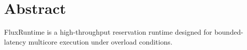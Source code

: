 \section*{Abstract}

FluxRuntime is a high-throughput reservation runtime designed for bounded-latency multicore execution under overload conditions.
